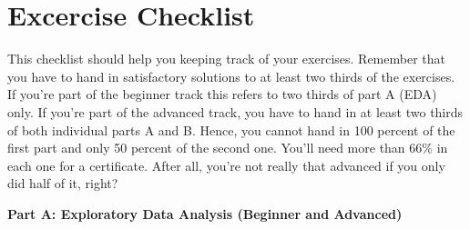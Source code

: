 \documentclass[
  11pt,
]{article}
\begin{document}
\newpage

\hypertarget{excercise-checklist}{%
\section{Excercise Checklist}\label{excercise-checklist}}

This checklist should help you keeping track of your exercises. Remember that you have to hand in satisfactory solutions to at least two thirds of the exercises. If you're part of the beginner track this refers to two thirds of part A (EDA) only. If you're part of the advanced track, you have to hand in at least two thirds of both individual parts A and B. Hence, you cannot hand in 100 percent of the first part and only 50 percent of the second one. You'll need more than 66\% in each one for a certificate. After all, you're not really that advanced if you only did half of it, right?

\textbf{Part A: Exploratory Data Analysis (Beginner and Advanced)}
\end{document}
